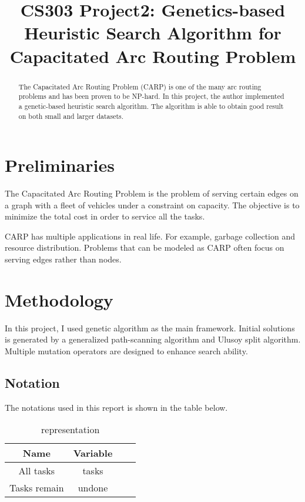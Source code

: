 \documentclass[conference]{IEEEtran}
\begin{document}
  
  \title{CS303 Project2: Genetics-based Heuristic Search Algorithm for Capacitated Arc Routing Problem}
  
  \author{
  }
  
  \maketitle
  
  \begin{abstract}
  The Capacitated Arc Routing Problem (CARP) is one of the many arc routing problems and has been proven to be NP-hard. In this project, the author implemented a genetic-based heuristic search algorithm. The algorithm is able to obtain good result on both small and larger datasets.
  \end{abstract}
  \IEEEpeerreviewmaketitle
  
  \section{Preliminaries}

    The Capacitated Arc Routing Problem  is the problem of serving certain edges on a graph with a fleet of vehicles under a constraint on capacity\cite{Wohlk2008}. The objective is to minimize the total cost in order to service all the tasks.

    CARP has multiple applications in real life. For example, garbage collection and resource distribution. Problems that can be modeled as CARP often focus on serving edges rather than nodes.

	
  
\section{Methodology}

In this project, I used genetic algorithm as the main framework. Initial solutions is generated by a generalized path-scanning algorithm and Ulusoy split algorithm. Multiple mutation operators are designed to enhance search ability.

\subsection{Notation}
The notations used in this report is shown in the table below.
    \begin{table}[H]
	\caption{representation}
	\centering
    \begin{tabular}{cccc}
    \toprule
    Name&Variable\\
    \midrule
    All tasks&tasks\\
    Tasks remain&undone\\
	\bottomrule
	\end{tabular}
	\label{table:1}
	\end{table}
\end{document}
